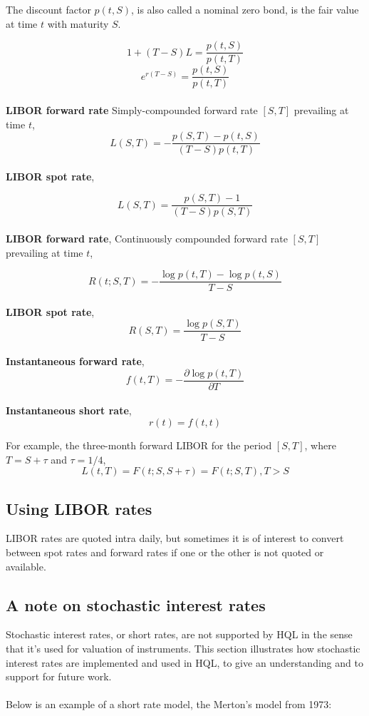 \documentclass[11pt,a4paper]{article}
\numberwithin{equation}{section}
\begin{document}

        The discount factor $p(t,S)$, is also called a nominal zero bond, is the fair value at time $t$ with maturity $S$.

	\[
	1+(T-S)L=\frac{p(t,S)}{p(t,T)}
	\]
	\[
	e^{r(T-S)}=\frac{p(t,S)}{p(t,T)}
	\]
	\\
	\textbf{LIBOR forward rate}
	Simply-compounded forward rate $[S,T]$ prevailing at time $t$,
	\[
	L(S,T) = -\frac{p(S,T)-p(t,S)}{(T-S)p(t,T)}
	\]
	\\
	\textbf{LIBOR spot rate},

	\[
	L(S,T)=\frac{p(S,T)-1}{(T-S)p(S,T)}
	\]
	\\
	\textbf{LIBOR forward rate},
	Continuously compounded forward rate $[S,T]$ prevailing at time $t$,

	\[
	R(t;S,T)=-\frac{\log{p(t,T)}-\log{p(t,S)}}{T-S}
	\]
	\\
	\textbf{LIBOR spot rate},
	\[
	R(S,T)=\frac{\log{p(S,T)}}{T-S}
	\]
	\\
	\textbf{Instantaneous forward rate},
	\[
	f(t,T)=-\frac{\partial\log{p(t,T)}}{\partial{T}}
	\]
	\\
	\textbf{Instantaneous short rate},
	\[
	r(t)=f(t,t)
	\]

	For example, the three-month forward LIBOR for the period $[S,T]$, where $T=S+\tau$ and $\tau=1/4$,
	\[
	L(t,T) = F(t;S,S+\tau) = F(t;S,T), T>S
	\]

	\subsection{Using LIBOR rates}
	LIBOR rates are quoted intra daily, but sometimes it is of interest to convert between spot rates and forward rates if one or the
	other is not quoted or available.

        \subsection{A note on stochastic interest rates}
        Stochastic interest rates, or short rates, are not supported by HQL in the sense that it's used for valuation of instruments.
        This section illustrates how stochastic interest rates are implemented and used in HQL, to give an understanding and to support for future work.
        \\\\
        Below is an example of a short rate model, the Merton's model from 1973:
\end{document}

